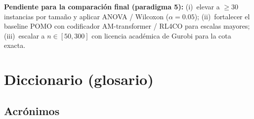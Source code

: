 \documentclass[11pt,a4paper]{article}
\begin{document}
\noindent\textbf{Pendiente para la comparación final (paradigma 5):} (i)~elevar a $\geq 30$
instancias por tamaño y aplicar ANOVA / Wilcoxon ($\alpha=0.05$); (ii)~fortalecer el baseline
POMO con codificador AM-transformer / RL4CO para escalas mayores; (iii)~escalar a $n\in[50,300]$
con licencia académica de Gurobi para la cota exacta.

\section{Diccionario (glosario)}
\label{sec:glosario}

\subsection*{Acrónimos}
\end{document}
